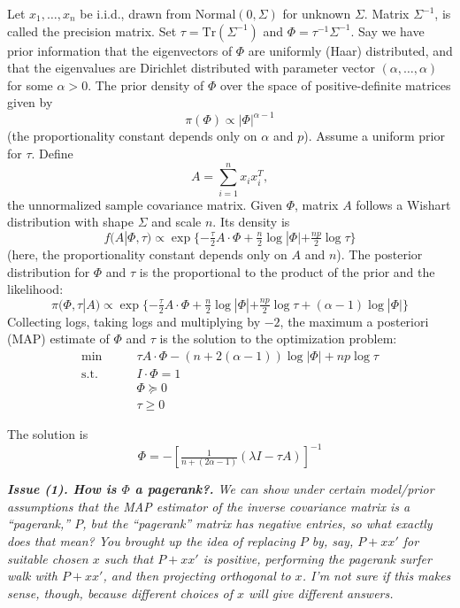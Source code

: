 \documentclass[12pt]{article}
\theoremstyle{plain}
\begin{document}
Let $x_1, \ldots, x_n$ be i.i.d., drawn from $\mathrm{Normal}(0, \Sigma)$
for unknown $\Sigma$.  Matrix $\Sigma^{-1}$, is called the precision
matrix.  Set $\tau = \mathrm{Tr}(\Sigma^{-1})$ and
$\Phi = \tau^{-1} \Sigma^{-1}$.  Say we have prior information that the
eigenvectors of $\Phi$ are uniformly (Haar) distributed, and that the
eigenvalues are Dirichlet distributed with parameter vector
$(\alpha, \ldots, \alpha)$ for some $\alpha > 0$.  The prior density
of $\Phi$ over the space of positive-definite matrices given by
\[
    \pi(\Phi) \propto |\Phi|^{\alpha-1}
\]
(the proportionality constant depends only on $\alpha$ and $p$).
Assume a uniform prior for $\tau$.
Define
\[
    A = \sum_{i=1}^n x_i x_i^T,
\]
the unnormalized sample covariance matrix.  Given $\Phi$, matrix $A$
follows a Wishart distribution with shape $\Sigma$ and scale $n$.  Its
density is
\[
    f(A | \Phi, \tau)
        \propto
        \exp\{
            -\tfrac{\tau}{2} A \cdot \Phi
            + \tfrac{n}{2} \log | \Phi| + \tfrac{np}{2} \log \tau
        \}
\]
(here, the proportionality constant depends only on $A$ and $n$).  The
posterior distribution for $\Phi$ and $\tau$ is the proportional to the
product of the prior and the likelihood:
\[
    \pi(\Phi, \tau | A)
        \propto
        \exp\{
            -\tfrac{\tau}{2} A \cdot \Phi
            + \tfrac{n}{2} \log | \Phi| + \tfrac{np}{2} \log \tau
            +
            (\alpha - 1)
            \log |\Phi|
        \}
\]
Collecting logs, taking logs and multiplying by $-2$, the maximum a
posteriori (MAP) estimate of $\Phi$ and $\tau$ is the solution to the
optimization problem:
\begin{align*}
    \min \qquad &\tau A \cdot \Phi - (n + 2 (\alpha - 1)) \log |\Phi| + np \log \tau \\
    \text{s.t.} \qquad & I \cdot \Phi = 1 \\
    \phantom{\text{s.t.}} \qquad & \Phi \succeq 0 \\
    \phantom{\text{s.t.}} \qquad & \tau \geq 0
\end{align*}

The solution is
\[
    \Phi = - [\tfrac{1}{n + (2\alpha - 1)}(\lambda I - \tau A)]^{-1}
\]

\textit{\textbf{Issue (1). How is $\Phi$ a pagerank?.}
We can show under certain model/prior assumptions that the MAP estimator of the inverse covariance matrix is a ``pagerank,'' $P$, but the ``pagerank'' matrix has negative entries, so what exactly does that mean?  You brought up the idea of replacing $P$ by, say, $P + x x'$ for suitable chosen $x$ such that $P + x x'$ is positive, performing the pagerank surfer walk with $P + x x'$, and then projecting orthogonal to $x$.  I'm not sure if this makes sense, though, because different choices of $x$ will give different answers.}
\end{document}
